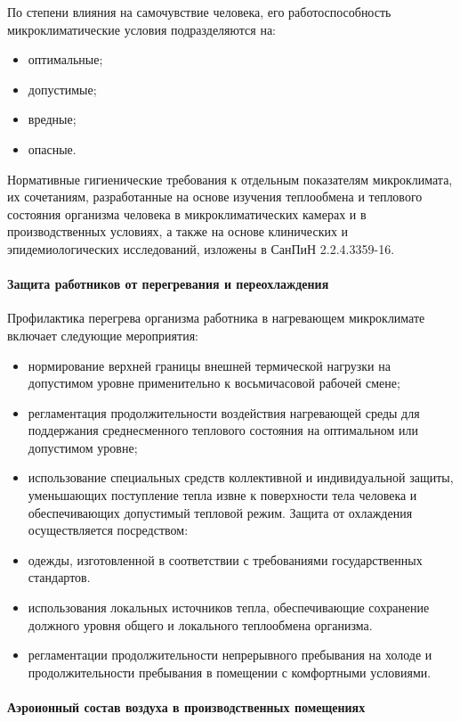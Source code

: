 По степени влияния на самочувствие человека, его работоспособность микроклиматические условия подразделяются на:
\begin{itemize}
	\item оптимальные;
	\item допустимые;
	\item вредные;
	\item опасные.
\end{itemize}

Нормативные гигиенические требования к отдельным показате­лям микроклимата, их сочетаниям, разработанные на основе изучения теплообмена и теплового состояния организма человека в микро­климатических камерах и в производственных условиях, а также на основе клинических и эпидемиологических исследований, изложены в СанПиН 2.2.4.3359-16.

\paragraph{Защита работников от перегревания и переохлаждения}
Профилактика перегрева организма работника в нагревающем микроклимате включает следующие мероприятия:
\begin{itemize}
	\item нормирование верхней границы внешней термической нагрузки на допустимом уровне применительно к восьмичасовой рабочей смене;
	\item регламентация продолжительности воздействия нагревающей среды для поддержания среднесменного теплового состояния на опти­мальном или допустимом уровне;
	\item использование специальных средств коллективной и индивиду­альной защиты, уменьшающих поступление тепла извне к поверхности тела человека и обеспечивающих допустимый тепловой режим.
Защита от охлаждения осуществляется посредством:
	\item одежды, изготовленной в соответствии с требованиями государственных стандартов.
	\item использования локальных источников тепла, обеспечивающие сохранение должного уровня общего и локального теплообмена организма.
	\item регламентации продолжительности непрерывного пребывания на холоде и продолжительности пребывания в помещении с комфортными условиями. 
\end{itemize}

\paragraph{Аэроионный состав воздуха в производственных помещениях}

